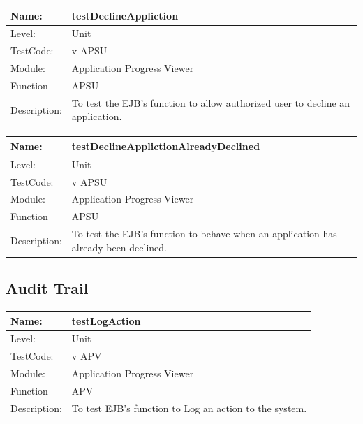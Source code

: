 \documentclass[12pt]{article}
\begin{document}
\begin{flushleft}
\begin{center}
\begin{tabular}{|l|p{12cm}|}
\hline

 Name: & testDeclineAppliction  \\
\hline
Level: & Unit \\
\hline
TestCode: & v APSU \\
\hline
Module:& Application Progress Viewer \\
\hline
Function & APSU \\
\hline
Description: & To test the EJB's function to allow authorized user to decline an application. \\
\hline
\end{tabular}
\end{center}

\begin{center}
\begin{tabular}{|l|p{12cm}|}
\hline

 Name: & testDeclineApplictionAlreadyDeclined  \\
\hline
Level: & Unit \\
\hline
TestCode: & v APSU \\
\hline
Module:& Application Progress Viewer \\
\hline
Function & APSU \\
\hline
Description: & To test the EJB's function to behave when an application has already been declined. \\
\hline
\end{tabular}
\end{center}


\subsection{Audit Trail}

\begin{center}
\begin{tabular}{|l|p{12cm}|}
\hline

 Name: & testLogAction  \\
\hline
Level: & Unit \\
\hline
TestCode: & v APV \\
\hline
Module:& Application Progress Viewer \\
\hline
Function & APV \\
\hline
Description: & To test EJB's function to Log an action to the system. \\
\hline
\end{tabular}
\end{center}


\end{flushleft}
\end{document}

